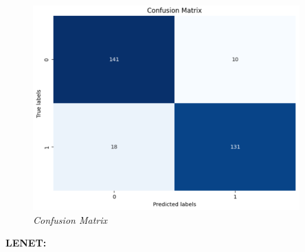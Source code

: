 \documentclass[12pt, a4paper]{report}
\begin{document}
\begin{figure}[htbp]
\begin{minipage}{0.3\textwidth}
    \end{minipage}
    \hspace{0.03\textwidth}
    \begin{minipage}{0.3\textwidth}
        \centering
        \includegraphics[width=\linewidth]{report images/image23.png}
        \caption{\textit{Confusion Matrix}}
    \end{minipage}
\end{figure}

\textbf{LENET:}
\end{document}
